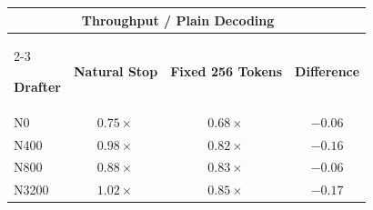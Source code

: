 
\begingroup
\renewcommand{\arraystretch}{1.22}
\setlength{\tabcolsep}{6pt}

\begin{tabular}{@{}lccc@{}}
\toprule

&
\multicolumn{2}{c}{

  \textbf{Throughput / Plain Decoding}
}
& \\

\cmidrule(lr){2-3}

\textbf{Drafter}
& \textbf{Natural Stop}
& \textbf{Fixed 256 Tokens}
& \textbf{Difference} \\

\midrule

N0
& $0.75\times$
& $0.68\times$
& $-0.06$ \\

N400
& $0.98\times$
& $0.82\times$
& $-0.16$ \\

N800
& $0.88\times$
& $0.83\times$
& $-0.06$ \\

N3200
& \cellcolor{tabGain}
  $\boldsymbol{1.02\times}$
& $0.85\times$
& \cellcolor{tabDrop}
  $\boldsymbol{-0.17}$ \\

\bottomrule
\end{tabular}
\endgroup
